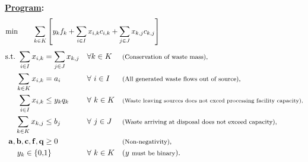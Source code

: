 \documentclass[12pt]{amsart}
\begin{document}
\textbf{\underline{Program}:} \\

\[ \min \qquad \sum_{k\in K} \left[ y_kf_k + \sum_{i\in I} x_{i,k}c_{i,k} + \sum_{j\in J} x_{k,j}c_{k,j} \right]
 	\hspace{45ex} \]
\begin{align*} 
	\text{s.t.}\
	\sum_{i\in I}x_{i,k} &= \sum_{j\in J} x_{k,j} & & \forall k\in K & & \text{\footnotesize(Conservation of waste mass),}  \\
	\sum_{k\in K} x_{i,k} &= a_i & & \forall\ i\in I & & \text{\footnotesize(All generated waste flows out of source),}  \\
	\sum_{i\in I} x_{i,k} &\leq y_kq_k & & \forall\ k\in K & & \text{\scriptsize(Waste leaving sources does not exced processing facility capacity),}  \\
	\sum_{k\in K} x_{k,j} &\leq b_j & & \forall\ j\in J & & \text{\footnotesize(Waste arriving at disposal does not exceed capacity),}  \\
	\mathbf{a,b,c,f,q} &\geq 0 & & & & \text{\footnotesize(Non-negativity),} \\
	y_k \in \{0,&1\} & &\forall\ k\in K & & (y\text{ \footnotesize must be binary}).
\end{align*}
\end{document}
